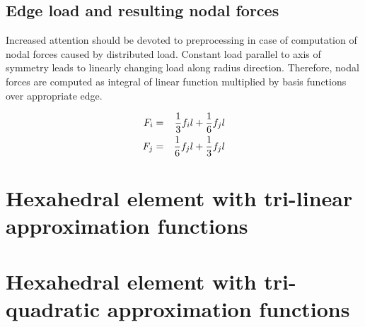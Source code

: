 \subsection{Edge load and resulting nodal forces}
Increased attention should be devoted to preprocessing in case of computation of nodal
forces caused by distributed load. Constant load parallel to axis of symmetry leads to
linearly changing load along radius direction. Therefore, nodal forces are computed as
integral of linear function multiplied by basis functions over appropriate edge.

\begin{eqnarray}
F_i &=& \mbox{$\displaystyle\frac{1}{3}$} f_i l + \mbox{$\displaystyle\frac{1}{6}$} f_j l
\\
F_j &=& \mbox{$\displaystyle\frac{1}{6}$} f_j l + \mbox{$\displaystyle\frac{1}{3}$} f_j l
\end{eqnarray}


\section{Hexahedral element with tri-linear approximation functions}
\label{secthexlinelem}

\section{Hexahedral element with tri-quadratic approximation functions}
\label{secthexquadelem}

